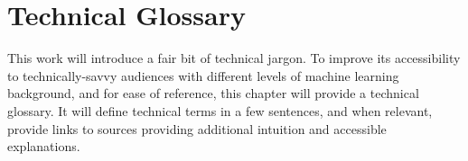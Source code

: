 \chapter{Technical Glossary\label{ch:technical-glossary}}
This work will introduce a fair bit of technical jargon. To improve its accessibility to technically-savvy audiences with different levels of machine learning background, and for ease of reference, this chapter will provide a technical glossary. It will define technical terms in a few sentences, and when relevant, provide links to sources providing additional intuition and accessible explanations.



